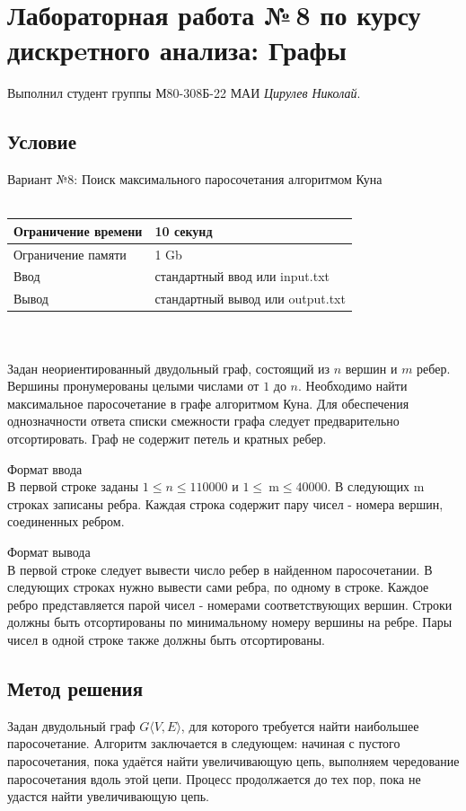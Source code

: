 \documentclass[12pt]{article}
\begin{document}
\section*{Лабораторная работа №\,8 по курсу дискрeтного анализа: Графы}

Выполнил студент группы М80-308Б-22 МАИ \textit{Цирулев Николай}.

\subsection*{Условие}
Вариант №8: Поиск максимального паросочетания алгоритмом Куна\\\\
\begin{tabular}{|l|l|}
\hline Ограничение времени & 10 секунд \\
\hline Ограничение памяти & 1 Gb \\
\hline Ввод & стандартный ввод или input.txt \\
\hline Вывод & стандартный вывод или output.txt \\
\hline
\end{tabular}
\\\\

Задан неориентированный двудольный граф, состоящий из $n$ вершин и $m$ ребер. Вершины пронумерованы целыми числами от $1$ до $n$. Необходимо найти максимальное паросочетание в графе алгоритмом Куна. Для обеспечения однозначности ответа списки смежности графа следует предварительно отсортировать. Граф не содержит петель и кратных ребер.

Формат ввода\\
В первой строке заданы $1 \leq n \leq 110000$ и $1 \leq \mathrm{~m} \leq 40000$. В следующих m строках записаны ребра. Каждая строка содержит пару чисел - номера вершин, соединенных ребром.

Формат вывода\\
В первой строке следует вывести число ребер в найденном паросочетании. В следующих строках нужно вывести сами ребра, по одному в строке. Каждое ребро представляется парой чисел - номерами соответствующих вершин. Строки должны быть отсортированы по минимальному номеру вершины на ребре. Пары чисел в одной строке также должны быть отсортированы.

\subsection*{Метод решения}
Задан двудольный граф $G\langle V, E\rangle$, для которого требуется найти наибольшее паросочетание. Алгоритм заключается в следующем: начиная с пустого паросочетания, пока удаётся найти увеличивающую цепь, выполняем чередование паросочетания вдоль этой цепи. Процесс продолжается до тех пор, пока не удастся найти увеличивающую цепь.
\end{document}
